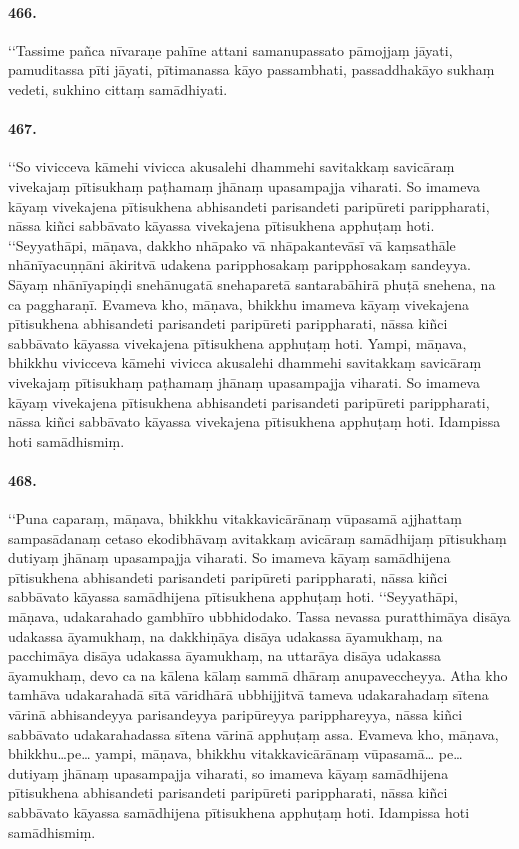 \paragraph{466.} ‘‘Tassime pañca nīvaraṇe pahīne attani samanupassato pāmojjaṃ jāyati, pamuditassa pīti jāyati, pītimanassa kāyo passambhati, passaddhakāyo sukhaṃ vedeti, sukhino cittaṃ samādhiyati.

\paragraph{467.} ‘‘So vivicceva kāmehi vivicca akusalehi dhammehi savitakkaṃ savicāraṃ vivekajaṃ pītisukhaṃ paṭhamaṃ jhānaṃ upasampajja viharati. So imameva kāyaṃ vivekajena pītisukhena abhisandeti parisandeti paripūreti parippharati, nāssa kiñci sabbāvato kāyassa vivekajena pītisukhena apphuṭaṃ hoti. ‘‘Seyyathāpi, māṇava, dakkho nhāpako vā nhāpakantevāsī vā kaṃsathāle nhānīyacuṇṇāni ākiritvā udakena paripphosakaṃ paripphosakaṃ sandeyya. Sāyaṃ nhānīyapiṇḍi snehānugatā snehaparetā santarabāhirā phuṭā snehena, na ca paggharaṇī. Evameva kho, māṇava, bhikkhu imameva kāyaṃ vivekajena pītisukhena abhisandeti parisandeti paripūreti parippharati, nāssa kiñci sabbāvato kāyassa vivekajena pītisukhena apphuṭaṃ hoti. Yampi, māṇava, bhikkhu vivicceva kāmehi vivicca akusalehi dhammehi savitakkaṃ savicāraṃ vivekajaṃ pītisukhaṃ paṭhamaṃ jhānaṃ upasampajja viharati. So imameva kāyaṃ vivekajena pītisukhena abhisandeti parisandeti paripūreti parippharati, nāssa kiñci sabbāvato kāyassa vivekajena pītisukhena apphuṭaṃ hoti. Idampissa hoti samādhismiṃ.

\paragraph{468.} ‘‘Puna caparaṃ, māṇava, bhikkhu vitakkavicārānaṃ vūpasamā ajjhattaṃ sampasādanaṃ cetaso ekodibhāvaṃ avitakkaṃ avicāraṃ samādhijaṃ pītisukhaṃ dutiyaṃ jhānaṃ upasampajja viharati. So imameva kāyaṃ samādhijena pītisukhena abhisandeti parisandeti paripūreti parippharati, nāssa kiñci sabbāvato kāyassa samādhijena pītisukhena apphuṭaṃ hoti. ‘‘Seyyathāpi, māṇava, udakarahado gambhīro ubbhidodako. Tassa nevassa puratthimāya disāya udakassa āyamukhaṃ, na dakkhiṇāya disāya udakassa āyamukhaṃ, na pacchimāya disāya udakassa āyamukhaṃ, na uttarāya disāya udakassa āyamukhaṃ, devo ca na kālena kālaṃ sammā dhāraṃ anupaveccheyya. Atha kho tamhāva udakarahadā sītā vāridhārā ubbhijjitvā tameva udakarahadaṃ sītena vārinā abhisandeyya parisandeyya paripūreyya paripphareyya, nāssa kiñci sabbāvato udakarahadassa sītena vārinā apphuṭaṃ assa. Evameva kho, māṇava, bhikkhu…pe… yampi, māṇava, bhikkhu vitakkavicārānaṃ vūpasamā… pe… dutiyaṃ jhānaṃ upasampajja viharati, so imameva kāyaṃ samādhijena pītisukhena abhisandeti parisandeti paripūreti parippharati, nāssa kiñci sabbāvato kāyassa samādhijena pītisukhena apphuṭaṃ hoti. Idampissa hoti samādhismiṃ.

